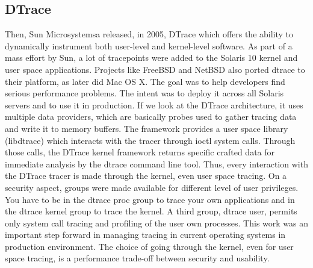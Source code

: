 \subsection{DTrace}
Then, Sun Microsystemsa released, in 2005, DTrace \cite{dtrace} which offers the
ability to dynamically instrument both user-level and kernel-level software. As
part of a mass effort by Sun, a lot of tracepoints were added to the Solaris 10
kernel and user space applications. Projects like FreeBSD and NetBSD also ported
dtrace to their platform, as later did Mac OS X. The goal was to help developers
find serious performance problems. The intent was to deploy it across all
Solaris servers and to use it in production.  If we look at the DTrace
architecture, it uses multiple data providers, which are basically probes used
to gather tracing data and write it to memory buffers.  The framework provides a
user space library (libdtrace) which interacts with the tracer through ioctl
system calls. Through those calls, the DTrace kernel framework returns specific
crafted data for immediate analysis by the dtrace command line tool. Thus, every
interaction with the DTrace tracer is made through the kernel, even user space
tracing.  On a security aspect, groups were made available for different level
of user privileges. You have to be in the dtrace proc group to trace your own
applications and in the dtrace kernel group to trace the kernel.  A third group,
dtrace user, permits only system call tracing and profiling of the user own
processes.  This work was an important step forward in managing tracing in
current operating systems in production environment. The choice of going through
the kernel, even for user space tracing, is a performance trade-off between
security and usability.

